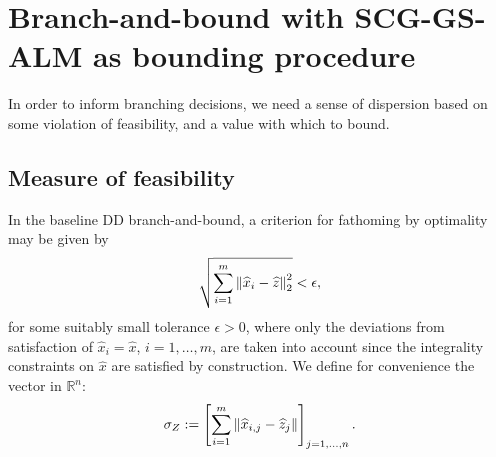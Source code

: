 
\section{Branch-and-bound with SCG-GS-ALM as bounding procedure}

In order to inform branching decisions, we need a sense of dispersion based on some violation of feasibility, and a value with which to bound.

\subsection{Measure of feasibility}

In the baseline DD branch-and-bound, a criterion for fathoming by optimality may be given by
\begin{equation}\label{FeasTolDDBasic}
\sqrt{\sum_{i=1}^m \left \| \widehat{x}_i-\widehat{z} \right \|_2^2} < \epsilon,
\end{equation}
for some suitably small tolerance $\epsilon > 0$,
where only the deviations from satisfaction of $\widehat{x}_i=\widehat{x}$, $i=1,\dots,m$, are taken into account since the integrality constraints on $\widehat{x}$ are satisfied by construction. We define for convenience the vector in $\mathbb{R}^n$:
$$
\sigma_Z:=\left[ \sum_{i=1}^m \left \| \widehat{x}_{i,j}-\widehat{z}_j \right \| \right]_{j=1,\dots,n}.
$$

